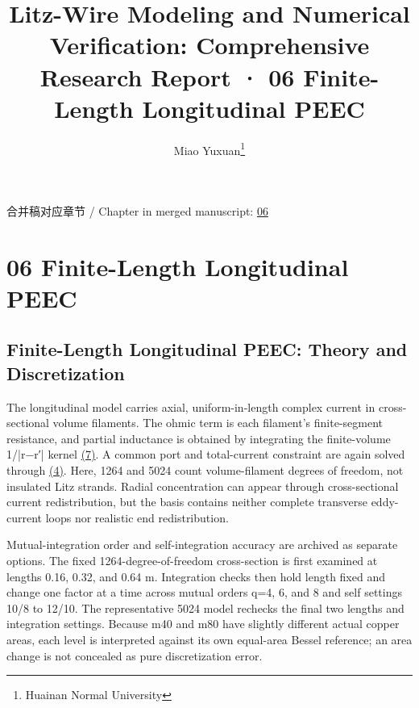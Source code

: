 \documentclass[journal,10pt]{IEEEtran}
\begin{document}
\title{Litz-Wire Modeling and Numerical Verification: Comprehensive Research Report · 06 Finite-Length Longitudinal PEEC}
\author{Miao Yuxuan\thanks{Huainan Normal University}}

\maketitle
\noindent 合并稿对应章节 / Chapter in merged manuscript: \href{report_en_ieee.pdf#chapter-06}{06}\par
\FloatBarrier
\section*{06 Finite-Length Longitudinal PEEC}
\hypertarget{chapter-06}{}
\subsection*{Finite-Length Longitudinal PEEC: Theory and Discretization}
\hypertarget{06.peec_method.heading}{}
The longitudinal model carries axial, uniform-in-length complex current in cross-sectional volume filaments. The ohmic term is each filament’s finite-segment resistance, and partial inductance is obtained by integrating the finite-volume 1/|r−r′| kernel \href{report_en_ieee.pdf#E08}{(7)}. A common port and total-current constraint are again solved through \href{report_en_ieee.pdf#E04}{(4)}. Here, 1264 and 5024 count volume-filament degrees of freedom, not insulated Litz strands. Radial concentration can appear through cross-sectional current redistribution, but the basis contains neither complete transverse eddy-current loops nor realistic end redistribution.


Mutual-integration order and self-integration accuracy are archived as separate options. The fixed 1264-degree-of-freedom cross-section is first examined at lengths 0.16, 0.32, and 0.64 m. Integration checks then hold length fixed and change one factor at a time across mutual orders q=4, 6, and 8 and self settings 10/8 to 12/10. The representative 5024 model rechecks the final two lengths and integration settings. Because m40 and m80 have slightly different actual copper areas, each level is interpreted against its own equal-area Bessel reference; an area change is not concealed as pure discretization error.
\end{document}
